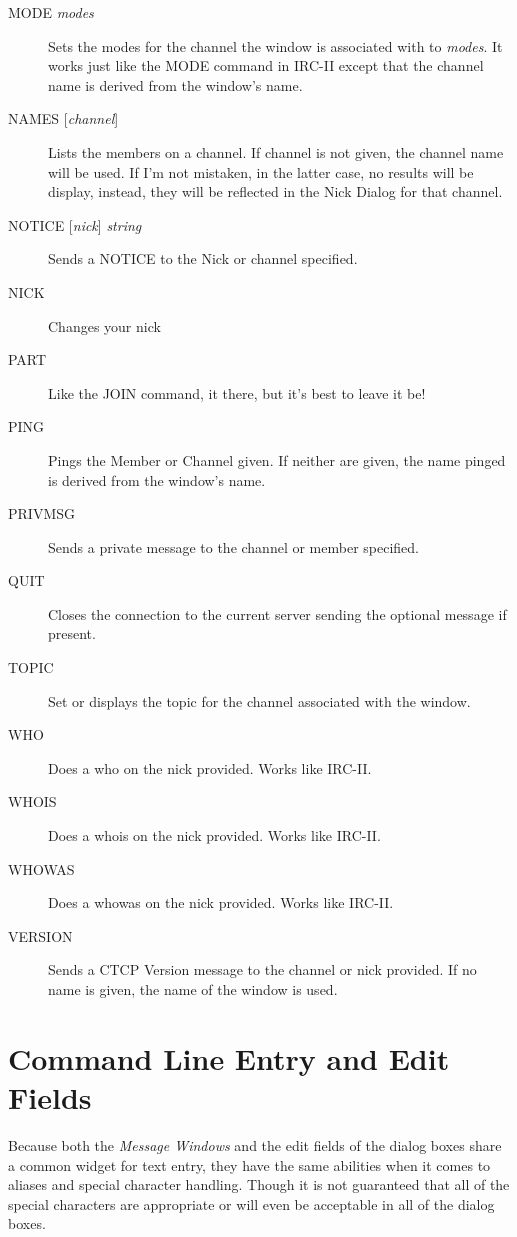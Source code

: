 \documentclass[titlepage]{article}
\begin{document}
\begin{description}
\item[MODE \textit{modes}]
   Sets  the  modes  for the channel the window is associated with to
   \textit{modes}. It
   works  just  like the MODE command in IRC-II except that the channel
   name is derived from the window's name.
\item[NAMES {[}\textit{channel}{]}]
   Lists  the  members  on  a  channel.  If  channel is not given, the
   channel name will be used. If I'm not mistaken, in the latter case,
   no  results will be display, instead, they will be reflected in the
   Nick Dialog for that channel.
\item[NOTICE {[}\textit{nick}{]} \textit{string}]
   Sends a NOTICE to the Nick or channel specified.
\item[NICK]
   Changes your nick
\item[PART]
   Like the JOIN command, it there, but it's best to leave it be!
\item[PING]
   Pings  the  Member or Channel given. If neither are given, the name
   pinged is derived from the window's name.
\item[PRIVMSG]
    Sends a private message to the channel or member specified.
\item[QUIT]
   Closes  the  connection to the current server sending the optional
   message if present.
\item[TOPIC]
   Set  or  displays  the  topic  for the channel associated with the
   window.
\item[WHO]
   Does a who on the nick provided. Works like IRC-II.
\item[WHOIS]
   Does a whois on the nick provided. Works like IRC-II.
\item[WHOWAS]
   Does a whowas on the nick provided. Works like IRC-II.
\item[VERSION]
   Sends  a  CTCP Version message to the channel or nick provided. If
   no name is given, the name of the window is used.
\end{description}

\section{Command Line Entry and Edit Fields}
Because both the \textit{Message Windows} and the edit fields of the
dialog boxes share a common widget for text entry, they have the same
abilities when it comes to aliases and special character handling.
Though it is not guaranteed that all of the special characters are
appropriate or will even be acceptable in all of the dialog boxes.
\end{document}
